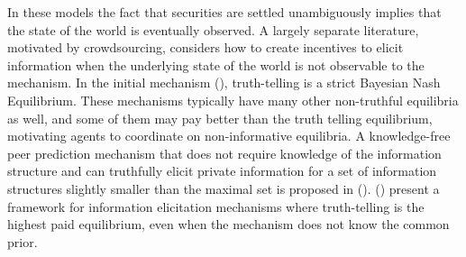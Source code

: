 In these models the fact that securities are settled unambiguously implies that the state of the world is eventually observed.
A largely separate literature, motivated by crowdsourcing, considers how to create incentives to elicit information when the underlying state of the world is not observable to the mechanism. 
In the initial mechanism (\cite{prelec2004bayesian,miller2005eliciting}), truth-telling is a strict Bayesian Nash Equilibrium. These mechanisms typically have many other non-truthful equilibria as well, and some of them may pay better than the truth telling equilibrium, motivating agents to coordinate on non-informative equilibria.
A knowledge-free peer prediction mechanism that does not require knowledge of the information structure and can truthfully elicit private information for a set of information structures slightly smaller than the maximal set is proposed in (\cite{zhang2014elicitability}).
(\cite{kong2016framework}) present a framework for information elicitation mechanisms where truth-telling is the highest paid equilibrium, even when the mechanism does not know the common prior.







